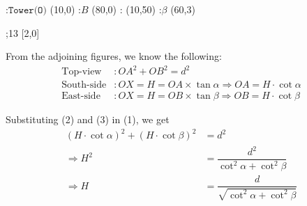   \begin{marginfigure}[0.5cm]
      :$\texttt{Tower(O)}$ (10,0)
      :$B$ (80,0)
      : (10,50)
      :$\beta$ (60,3)

    \figdrawbegin{}
      \figdrawline [0,1,2,0]
      ;13 [2,0]
    \figdrawend
		\centerline{\box\figBoxA}
  \end{marginfigure}
\fi  

\begin{solution}[\fullpage]
	From the adjoining figures, we know the following:
	\begin{align}
		\text{Top-view} &: OA^2 + OB^2 = d^2 \\
		\text{South-side} &: OX = H = OA \times\tan\alpha \Rightarrow OA = H\cdot\cot\alpha \\
		\text{East-side} &: OX = H = OB \times\tan\beta \Rightarrow OB = H\cdot\cot\beta
	\end{align}
	
	Substituting (2) and (3) in (1), we get
	\begin{align}
		(H\cdot\cot\alpha)^2 + (H\cdot\cot\beta)^2 &= d^2 \\
		\Rightarrow H^2 &= \dfrac{d^2}{\cot^2\alpha + \cot^2\beta} \\
		\Rightarrow H &= \dfrac{d}{\sqrt{\cot^2\alpha + \cot^2\beta}}
	\end{align}
\end{solution}
